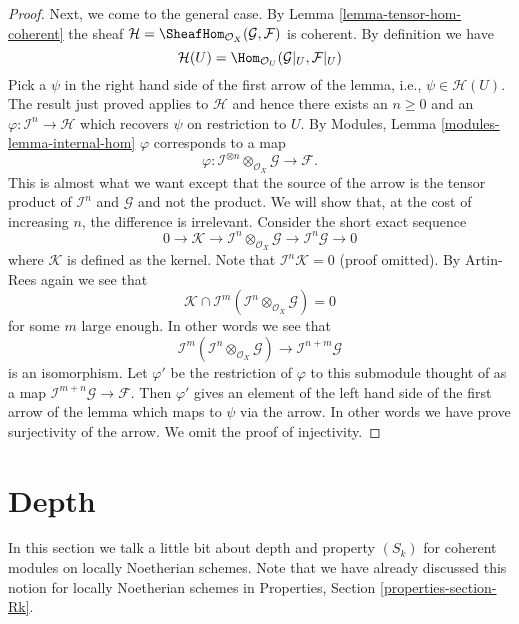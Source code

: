 \begin{proof}
\medskip\noindent
Next, we come to the general case.
By Lemma \ref{lemma-tensor-hom-coherent} the sheaf
$\mathcal{H} = \SheafHom_{\mathcal{O}_X}(\mathcal{G}, \mathcal{F})$
is coherent. By definition we have
$$
\mathcal{H}(U)
=
\Hom_{\mathcal{O}_U}(\mathcal{G}|_U, \mathcal{F}|_U)
$$
Pick a $\psi$ in the right hand side of the first arrow of the
lemma, i.e.,  $\psi \in \mathcal{H}(U)$. The result just proved applies
to $\mathcal{H}$ and hence there exists an $n \geq 0$ and an
$\varphi : \mathcal{I}^n \to \mathcal{H}$ which recovers
$\psi$ on restriction to $U$. By
Modules, Lemma \ref{modules-lemma-internal-hom}
$\varphi$ corresponds to a map
$$
\varphi :
\mathcal{I}^{\otimes n} \otimes_{\mathcal{O}_X} \mathcal{G}
\longrightarrow
\mathcal{F}.
$$
This is almost what we want except that the source of the arrow
is the tensor product of $\mathcal{I}^n$ and $\mathcal{G}$
and not the product. We will show that, at the cost of increasing $n$,
the difference is irrelevant. Consider the short exact sequence
$$
0 \to \mathcal{K} \to
\mathcal{I}^n \otimes_{\mathcal{O}_X} \mathcal{G} \to
\mathcal{I}^n\mathcal{G} \to 0
$$
where $\mathcal{K}$ is defined as the kernel. Note that
$\mathcal{I}^n\mathcal{K} = 0$ (proof omitted). By Artin-Rees
again we see that
$$
\mathcal{K}
\cap
\mathcal{I}^m(\mathcal{I}^n \otimes_{\mathcal{O}_X} \mathcal{G})
=
0
$$
for some $m$ large enough. In other words we see that
$$
\mathcal{I}^m(\mathcal{I}^n \otimes_{\mathcal{O}_X} \mathcal{G})
\longrightarrow
\mathcal{I}^{n + m}\mathcal{G}
$$
is an isomorphism. Let $\varphi'$ be the restriction of
$\varphi$ to this submodule thought of as a map
$\mathcal{I}^{m + n}\mathcal{G} \to \mathcal{F}$.
Then $\varphi'$ gives an element
of the left hand side of the first arrow of the lemma which
maps to $\psi$ via the arrow. In other words we have prove surjectivity
of the arrow. We omit the proof of injectivity.
\end{proof}









\section{Depth}
\label{section-depth}

\noindent
In this section we talk a little bit about depth and property
$(S_k)$ for coherent modules on locally Noetherian schemes.
Note that we have already discussed this notion for locally
Noetherian schemes in Properties, Section \ref{properties-section-Rk}.

